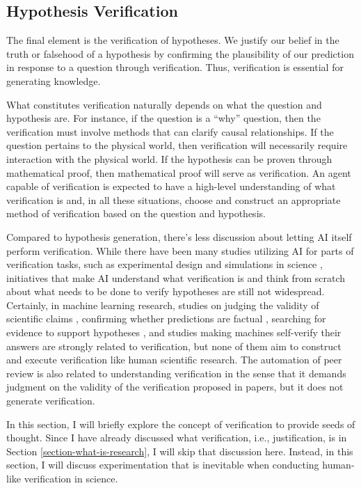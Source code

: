 \subsection{Hypothesis Verification}
The final element is the verification of hypotheses. We justify our belief in the truth or falsehood of a hypothesis by confirming the plausibility of our prediction in response to a question through verification. Thus, verification is essential for generating knowledge.

What constitutes verification naturally depends on what the question and hypothesis are. For instance, if the question is a ``why'' question, then the verification must involve methods that can clarify causal relationships. If the question pertains to the physical world, then verification will necessarily require interaction with the physical world. If the hypothesis can be proven through mathematical proof, then mathematical proof will serve as verification. An agent capable of verification is expected to have a high-level understanding of what verification is and, in all these situations, choose and construct an appropriate method of verification based on the question and hypothesis.

Compared to hypothesis generation, there's less discussion about letting AI itself perform verification. While there have been many studies utilizing AI for parts of verification tasks, such as experimental design \cite{chaloner1995bayesian} and simulations in science \cite{baker2019basic}, initiatives that make AI understand what verification is and think from scratch about what needs to be done to verify hypotheses are still not widespread. Certainly, in machine learning research, studies on judging the validity of scientific claims \cite{wadden2020fact}, confirming whether predictions are factual \cite{guo2022survey}, searching for evidence to support hypotheses \cite{koneru2023can}, and studies making machines self-verify their answers \cite{dhuliawala2023chain} are strongly related to verification, but none of them aim to construct and execute verification like human scientific research. The automation of peer review \cite{kousha2022artificial,lin2021automated1} is also related to understanding verification in the sense that it demands judgment on the validity of the verification proposed in papers, but it does not generate verification.

In this section, I will briefly explore the concept of verification to provide seeds of thought. Since I have already discussed what verification, i.e., justification, is in Section \ref{section-what-is-research}, I will skip that discussion here. Instead, in this section, I will discuss experimentation that is inevitable when conducting human-like verification in science.


